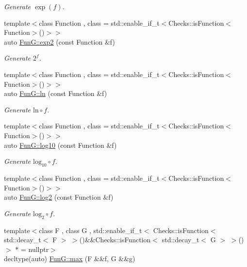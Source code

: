 \begin{DoxyCompactItemize}
\begin{DoxyCompactList}\small\item\em Generate $ \exp(f) $. \end{DoxyCompactList}\item 
{\footnotesize template$<$class Function , class  = std\+::enable\+\_\+if\+\_\+t$<$\+Checks\+::is\+Function$<$\+Function$>$()$>$$>$ }\\auto \hyperlink{group__CMathGroup_ga7724faf7db6e9583ac91df322c26ecf5}{Fun\+G\+::exp2} (const Function \&f)
\begin{DoxyCompactList}\small\item\em Generate $2^f$. \end{DoxyCompactList}\item 
{\footnotesize template$<$class Function , class  = std\+::enable\+\_\+if\+\_\+t$<$\+Checks\+::is\+Function$<$\+Function$>$()$>$$>$ }\\auto \hyperlink{group__CMathGroup_ga31313571b08f65b853643e14fc8fc714}{Fun\+G\+::ln} (const Function \&f)
\begin{DoxyCompactList}\small\item\em Generate $ \mathrm{ln}\circ f $. \end{DoxyCompactList}\item 
{\footnotesize template$<$class Function , class  = std\+::enable\+\_\+if\+\_\+t$<$\+Checks\+::is\+Function$<$\+Function$>$()$>$$>$ }\\auto \hyperlink{group__CMathGroup_gae9506f4e0e6fad4f756f636044697bfe}{Fun\+G\+::log10} (const Function \&f)
\begin{DoxyCompactList}\small\item\em Generate $ \mathrm{log}_{10}\circ f $. \end{DoxyCompactList}\item 
{\footnotesize template$<$class Function , class  = std\+::enable\+\_\+if\+\_\+t$<$\+Checks\+::is\+Function$<$\+Function$>$()$>$$>$ }\\auto \hyperlink{group__CMathGroup_gacd6be7e9de7bbd54c852f0acf0c7d2c2}{Fun\+G\+::log2} (const Function \&f)
\begin{DoxyCompactList}\small\item\em Generate $ \mathrm{log}_{2}\circ f $. \end{DoxyCompactList}\item 
{\footnotesize template$<$class F , class G , std\+::enable\+\_\+if\+\_\+t$<$ Checks\+::is\+Function$<$ std\+::decay\+\_\+t$<$ F $>$ $>$()\&\&\+Checks\+::is\+Function$<$ std\+::decay\+\_\+t$<$ G $>$ $>$() $>$ $\ast$  = nullptr$>$ }\\decltype(auto) \hyperlink{group__CMathGroup_ga29ce7b8f01cdb2c87da6b39f16d37925}{Fun\+G\+::max} (F \&\&f, G \&\&g)

\end{DoxyCompactItemize}
